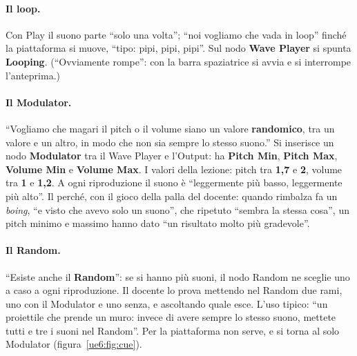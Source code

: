 \paragraph{Il loop.} Con Play il suono parte ``solo una volta''; ``noi vogliamo che vada
in loop'' finché la piattaforma si muove, ``tipo: pipi, pipi, pipi''. Sul nodo
\textbf{Wave Player} si spunta \textbf{Looping}. (``Ovviamente rompe'': con la barra
spaziatrice si avvia e si interrompe l'anteprima.)

\paragraph{Il Modulator.} ``Vogliamo che magari il pitch o il volume siano un valore
\textbf{randomico}, tra un valore e un altro, in modo che non sia sempre lo stesso
suono.'' Si inserisce un nodo \textbf{Modulator} tra il Wave Player e l'Output: ha
\textbf{Pitch Min}, \textbf{Pitch Max}, \textbf{Volume Min} e \textbf{Volume Max}. I
valori della lezione: pitch tra \textbf{1,7} e \textbf{2}, volume tra \textbf{1} e
\textbf{1,2}. A ogni riproduzione il suono è ``leggermente più basso, leggermente più
alto''. Il perché, con il gioco della palla del docente: quando rimbalza fa un
\emph{boing}, ``e visto che avevo solo un suono'', che ripetuto ``sembra la stessa
cosa'', un pitch minimo e massimo hanno dato ``un risultato molto più gradevole''.

\paragraph{Il Random.} ``Esiste anche il \textbf{Random}'': se si hanno più suoni, il
nodo Random ne sceglie uno a caso a ogni riproduzione. Il docente lo prova mettendo nel
Random due rami, uno con il Modulator e uno senza, e ascoltando quale esce. L'uso tipico:
``un proiettile che prende un muro: invece di avere sempre lo stesso suono, mettete tutti
e tre i suoni nel Random''. Per la piattaforma non serve, e si torna al solo Modulator
(figura~\ref{ue6:fig:cue}).

